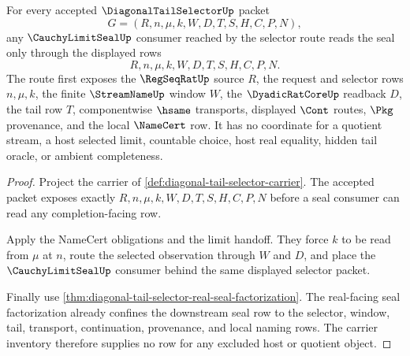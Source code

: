 \begin{theorem}
\label{thm:diagonal-tail-selector-cauchy-limit-seal-factorization}
For every accepted $\DiagonalTailSelectorUp$ packet
$$
G=(R,n,\mu,k,W,D,T,S,H,C,P,N),
$$
any $\CauchyLimitSealUp$ consumer reached by the selector route reads the
seal only through the displayed rows
$$
R,n,\mu,k,W,D,T,S,H,C,P,N.
$$
The route first exposes the $\RegSeqRatUp$ source $R$, the request and
selector rows $n,\mu,k$, the finite $\StreamNameUp$ window $W$, the
$\DyadicRatCoreUp$ readback $D$, the tail row $T$, componentwise $\hsame$
transports, displayed $\Cont$ routes, $\Pkg$ provenance, and the local
$\NameCert$ row. It has no coordinate for a quotient stream, a host selected
limit, countable choice, host real equality, hidden tail oracle, or ambient
completeness.
\end{theorem}
\begin{proof}
Project the carrier of \autoref{def:diagonal-tail-selector-carrier}. The
accepted packet exposes exactly $R,n,\mu,k,W,D,T,S,H,C,P,N$ before a seal
consumer can read any completion-facing row.

Apply the NameCert obligations and the limit handoff. They force $k$ to be
read from $\mu$ at $n$, route the selected observation through $W$ and $D$,
and place the $\CauchyLimitSealUp$ consumer behind the same displayed
selector packet.

Finally use \autoref{thm:diagonal-tail-selector-real-seal-factorization}.
The real-facing seal factorization already confines the downstream seal row
to the selector, window, tail, transport, continuation, provenance, and local
naming rows. The carrier inventory therefore supplies no row for any excluded
host or quotient object.
\end{proof}


